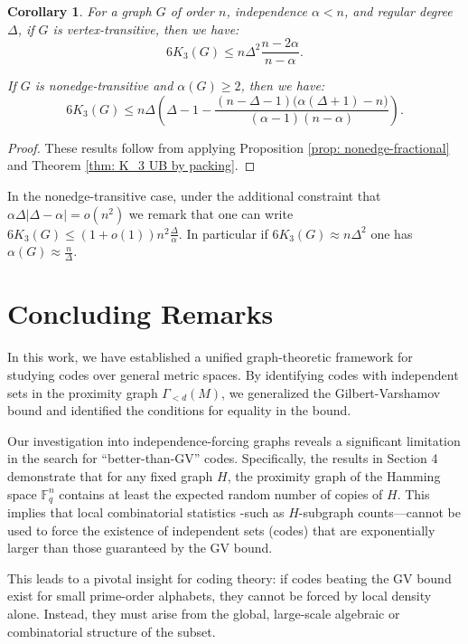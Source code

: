 \documentclass[12pt]{article}
\newtheorem{corollary}[theorem]{Corollary}
\newcommand{\Fq}{\mathbb{F}_q}
\begin{document}
\begin{corollary}
\label{cor: UB by tri_1}
    For a graph $G$ of order $n$, independence $\alpha<n$, and regular degree $\Delta$, if $G$ is vertex-transitive, then we have:
\[
6K_3(G)\leq
n\Delta^2\frac{n-2\alpha}{n-\alpha}.
\]

\noindent If $G$ is nonedge-transitive and $\alpha(G)\geq2$, then we have:
\[
6K_3(G)\leq n\Delta\left(\Delta-1-\frac{(n-\Delta-1)\bigl(\alpha(\Delta+1)-n\bigr)}{(\alpha-1)(n-\alpha)}\right).
\]
\end{corollary}
\begin{proof}

These results follow from applying Proposition \ref{prop: nonedge-fractional} and Theorem \ref{thm: K_3 UB by packing}. 

\end{proof}

In the nonedge-transitive case, under the additional constraint that $\alpha\Delta|\Delta-\alpha|=o(n^2)$ we remark that one can write $6K_3(G)\leq(1+o(1))n^2\frac{\Delta}{\alpha}$. In particular if $6K_3(G)\approx n\Delta^2$ one has $\alpha(G)\approx\frac{n}{\Delta}$.




\section{Concluding Remarks}

In this work, we have established a unified graph-theoretic framework for studying codes over general metric spaces. By identifying codes with independent sets in the proximity graph $\Gamma_{<d}(M)$, we  generalized the Gilbert-Varshamov bound and identified the conditions for  equality in the bound.

Our investigation into independence-forcing graphs reveals a significant limitation in the search for ``better-than-GV'' codes. Specifically, the results in Section 4 demonstrate that for any fixed graph $H$, the proximity graph of the Hamming space $\Fq^n$ contains at least the expected random number of copies of $H$. This implies that local combinatorial statistics -such as $H$-subgraph counts—cannot be used to force the existence of independent sets (codes) that are exponentially larger than those guaranteed by the GV bound.

This leads to a pivotal insight for coding theory: if codes beating the GV bound exist for small prime-order alphabets, they cannot be forced by local density alone. Instead, they must arise from the global, large-scale algebraic or combinatorial structure of the subset.
\end{document}
